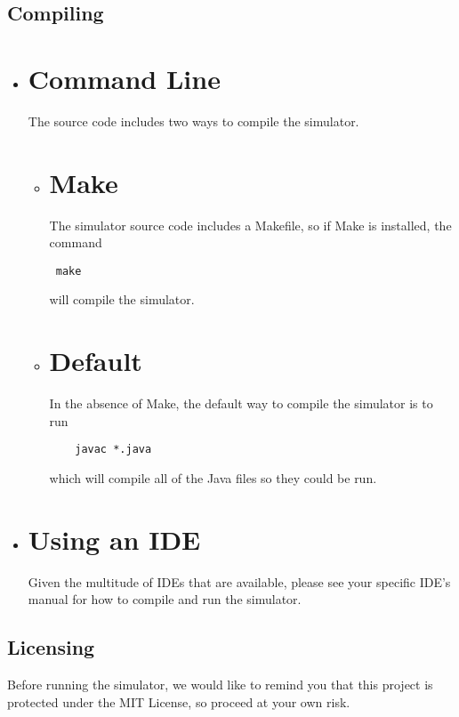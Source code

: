 \documentclass[12pt]{article}
\begin{document}
\subsection{Compiling}
\begin{itemize}

\item \section*{Command Line}
  The source code includes two ways to compile the simulator.
  \begin{itemize}
  \item
    \section*{Make}
    The simulator source code includes a Makefile, so if Make
    is installed, the command \begin{verbatim} make \end{verbatim}
    will compile the simulator.
    
  \item
    \section*{Default}
    In the absence of Make, the default way to compile the simulator
    is to run
\begin{verbatim}
    javac *.java
\end{verbatim}
which will compile all of the Java files so they could be run.
    
  \end{itemize}
  
\item \section*{Using an IDE}
  Given the multitude of IDEs that are available, please see your
  specific IDE's manual for how to compile and run the simulator.
  
\end{itemize}

\subsection{Licensing}
Before running the simulator, we would like to remind you that this
project is protected under the MIT License, so proceed at your own risk.
\end{document}
